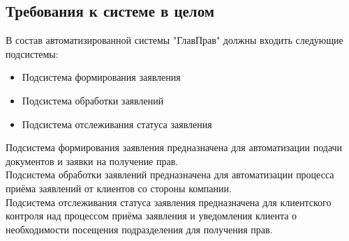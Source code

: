 \documentclass[russian, utf8, 12pt,pointsubsection,floatsubsection]{eskdtext}
\begin{document}
\subsection{Требования к системе в целом}


В состав автоматизированной системы "ГлавПрав" должны входить следующие подсистемы:
\begin{itemize}
    \item Подсистема формирования заявления
    \item Подсистема обработки заявлений
    \item Подсистема отслеживания статуса заявления
\end{itemize}

Подсистема формирования заявления предназначена для автоматизации подачи документов и заявки на получение прав. \\
Подсистема обработки заявлений предназначена для автоматизации процесса приёма заявлений от клиентов со стороны компании.\\
Подсистема отслеживания статуса заявления предназначена для клиентского контроля над процессом приёма заявления и уведомления клиента о необходимости посещения подразделения для получения прав.
\end{document}
